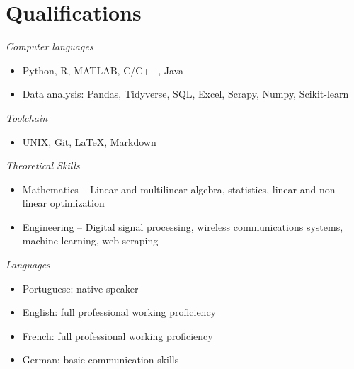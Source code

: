 \section{Qualifications} 

{\sl Computer languages} 
\begin{itemize}
	\item[] Python, R, MATLAB, C/C++, Java
	\item[] Data analysis: Pandas, Tidyverse, SQL, Excel, Scrapy, Numpy, Scikit-learn
\end{itemize}

{\sl Toolchain}
\begin{itemize}
	\item[] UNIX, Git, \LaTeX, Markdown
\end{itemize}

{\sl Theoretical Skills}
\begin{itemize}
	\item[] Mathematics --  Linear and multilinear algebra, statistics, linear and non-linear optimization
	\item[] Engineering -- Digital signal processing, wireless communications systems, machine learning, web scraping
\end{itemize}

{\sl Languages}
\begin{itemize}
	\item[] Portuguese: native speaker
	\item[] English: full professional working proficiency
	\item[] French: full professional working proficiency
	\item[] German: basic communication skills
\end{itemize}
